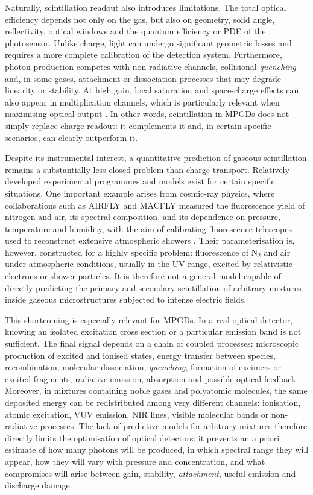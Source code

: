 \documentclass[12pt,a4paper]{article}
\begin{document}
Naturally, scintillation readout also introduces limitations. The total optical efficiency depends not only on the gas, but also on geometry, solid angle, reflectivity, optical windows and the quantum efficiency or PDE of the photosensor. Unlike charge, light can undergo significant geometric losses and requires a more complete calibration of the detection system. Furthermore, photon production competes with non-radiative channels, collisional \textit{quenching} and, in some gases, attachment or dissociation processes that may degrade linearity or stability. At high gain, local saturation and space-charge effects can also appear in multiplication channels, which is particularly relevant when maximising optical output \cite{christophorou1999electron,amedo2023observation}. In other words, scintillation in MPGDs does not simply replace charge readout: it complements it and, in certain specific scenarios, can clearly outperform it.

Despite its instrumental interest, a quantitative prediction of gaseous scintillation remains a substantially less closed problem than charge transport. Relatively developed experimental programmes and models exist for certain specific situations. One important example arises from cosmic-ray physics, where collaborations such as AIRFLY and MACFLY measured the fluorescence yield of nitrogen and air, its spectral composition, and its dependence on pressure, temperature and humidity, with the aim of calibrating fluorescence telescopes used to reconstruct extensive atmospheric showers \cite{colin2007macfly,ave2008airfly}. Their parameterisation is, however, constructed for a highly specific problem: fluorescence of N$_2$ and air under atmospheric conditions, usually in the UV range, excited by relativistic electrons or shower particles. It is therefore not a general model capable of directly predicting the primary and secondary scintillation of arbitrary mixtures inside gaseous microstructures subjected to intense electric fields.

This shortcoming is especially relevant for MPGDs. In a real optical detector, knowing an isolated excitation cross section or a particular emission band is not sufficient. The final signal depends on a chain of coupled processes: microscopic production of excited and ionised states, energy transfer between species, recombination, molecular dissociation, \textit{quenching}, formation of excimers or excited fragments, radiative emission, absorption and possible optical feedback. Moreover, in mixtures containing noble gases and polyatomic molecules, the same deposited energy can be redistributed among very different channels: ionisation, atomic excitation, VUV emission, NIR lines, visible molecular bands or non-radiative processes. The lack of predictive models for arbitrary mixtures therefore directly limits the optimisation of optical detectors: it prevents an a priori estimate of how many photons will be produced, in which spectral range they will appear, how they will vary with pressure and concentration, and what compromises will arise between gain, stability, \textit{attachment}, useful emission and discharge damage.
\end{document}

